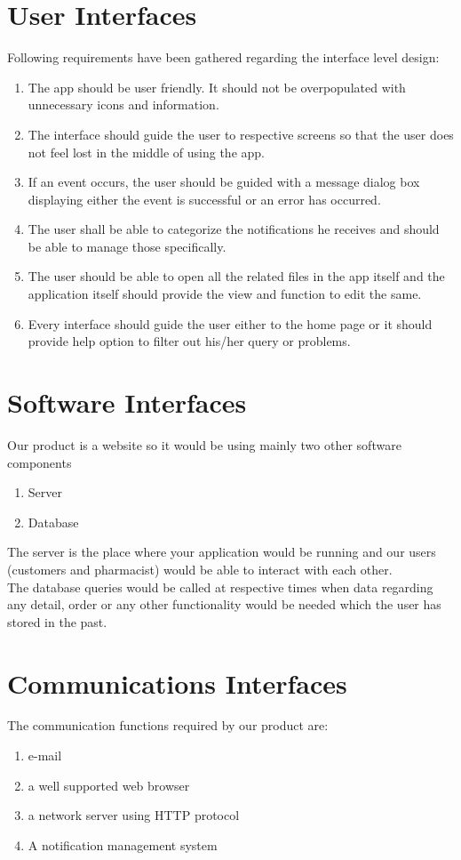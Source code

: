 \documentclass{scrreprt}
\begin{document}
\section{User Interfaces}
Following requirements have been gathered regarding the interface level design:
\begin{enumerate}
\item The app should be user friendly. It should not be overpopulated with unnecessary icons and information. 
\item The interface should guide the user to respective screens so that the user does not feel lost in the middle of using the app.
\item If an event occurs, the user should be guided with a message dialog box displaying either the event is successful or an error has 
       occurred.    
\item The user shall be able to categorize the notifications he receives and should be able to manage those specifically.
\item The user should be able to open all the related files in the app itself and the application itself should provide the view and           function to edit the same.
\item Every interface should guide the user either to the home page or it should provide help option to filter out his/her query or problems. 
\end{enumerate}

\section{Software Interfaces}
Our product is a website so it would be using mainly two other software components 
\begin{enumerate}
\item Server
\item Database
\end{enumerate}
The server is the place where your application would be running and our users (customers and pharmacist) would be able to interact with each other.  \\
The database queries would be called at respective times when data regarding any detail, order or any other functionality would be needed which the user has stored in the past.

\section{Communications Interfaces}
The communication functions required by our product are:
\begin{enumerate}
\item e-mail 
\item a well supported web browser
\item a network server using HTTP protocol
\item A notification management system
\end{enumerate}
\end{document}
